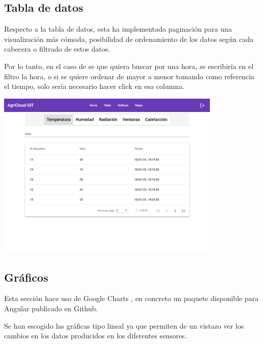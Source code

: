 \subsection{Tabla de datos}

Respecto a la tabla de datos, esta ha implementado paginación para una visualización más cómoda, posibilidad de ordenamiento de los datos según cada cabecera o filtrado de estos datos.

Por lo tanto, en el caso de se que quiera buscar por una hora, se escribiría en el filtro la hora, o si se quiere ordenar de mayor a menor tomando como referencia el tiempo, solo sería necesario hacer click en esa columna.

\newpage

\begin{center}
    \centering
    \includegraphics[width=0.8\textwidth]{img/06-Web-tablas.png}
    \label{fig:tablas-de-datos-final}
\end{center}

\subsection{Gráficos}

Esta sección hace uso de Google Charts \cite{charts-google}, en concreto un paquete disponible para Angular publicado en Github.

Se han escogido las gráficas tipo lineal ya que permiten de un vistazo ver los cambios en los datos producidos en los diferentes sensores.

